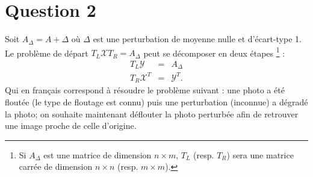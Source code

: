 \section{Question 2}
Soit $A_{\Delta} = A + \Delta$ où $\Delta$ est une perturbation de moyenne nulle et d'écart-type 1. Le problème de départ $T_L \mathcal{X} T_R = A_{\Delta}$ peut se décomposer en deux étapes \footnote{Si $A_{\Delta}$
est une matrice de dimension $n \times m$, $T_L$ (resp. $T_R$) sera une matrice carrée de dimension $n \times n$ (resp. $m \times m$).} :
\begin{eqnarray}
  \label{eq_q2}
  T_L \mathcal{Y} &=& A_{\Delta}\\
  T_R \mathcal{X}^T &=& \mathcal{Y}^T.
\end{eqnarray}
Qui en français correspond à résoudre le problème suivant : une photo a été floutée (le type de floutage est connu) puis une perturbation (inconnue) a dégradé la photo; on souhaite maintenant déflouter la photo perturbée afin de retrouver une image proche de celle d'origine.



